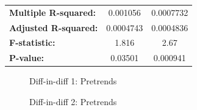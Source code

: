 \documentclass[12pt]{article}
\begin{document}
\begin{table}[h!]
\begin{tabular}{lcccc}
\multicolumn{1}{l}{\textbf{Multiple R-squared:}} & \multicolumn{2}{c}{0.001056} & \multicolumn{2}{c}{0.0007732} \\
\multicolumn{1}{l}{\textbf{Adjusted R-squared:}} & \multicolumn{2}{c}{0.0004743} & \multicolumn{2}{c}{0.0004836} \\
\multicolumn{1}{l}{\textbf{F-statistic:}} & \multicolumn{2}{c}{1.816} & \multicolumn{2}{c}{2.67} \\
\multicolumn{1}{l}{\textbf{P-value:}} & \multicolumn{2}{c}{0.03501} & \multicolumn{2}{c}{0.000941} \\
\bottomrule
\end{tabular}
\end{table}

\begin{figure}[h]
\caption{Diff-in-diff 1: Pretrends}
\centering
\end{figure}

\begin{figure}[h]
\caption{Diff-in-diff 2: Pretrends}
\centering
\end{figure}

\newpage 


\end{document}
